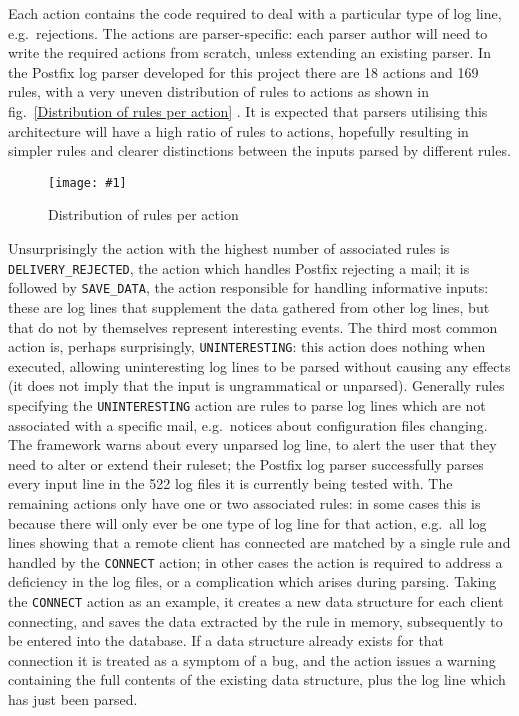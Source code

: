 \documentclass{svmult}
\newcommand{\showgraph}[3]{%
    \begin{figure}[btp]%
        \texttt{[image: \#1]}%
        \caption{#2}\label{#3}%
    \end{figure}%
}
\newcommand{\refwithlabel}[2]{%
    #1~\vref{#2}%
}
\newcommand{\graphref}[1]{%
    \refwithlabel{fig.}{#1}%
}
\newcommand{\numberOFrules}[0]{%
    169%
}
\newcommand{\numberOFlogFILESall}[0]{%
    522%
}
\newcommand{\numberOFactions}[0]{%
    18%
}
\begin{document}
Each action contains the code required to deal with a particular type of
log line, e.g.\ rejections.  The actions are parser-specific: each parser
author will need to write the required actions from scratch, unless
extending an existing parser.  In the Postfix log parser developed for this
project there are \numberOFactions{} actions and \numberOFrules{} rules,
with a very uneven distribution of rules to actions as shown in
\graphref{Distribution of rules per action}.  It is expected that parsers
utilising this architecture will have a high ratio of rules to actions,
hopefully resulting in simpler rules and clearer distinctions between the
inputs parsed by different rules.
\showgraph{build/graph-action-distribution}{Distribution of rules per
action}{Distribution of rules per action} Unsurprisingly the action with
the highest number of associated rules is \texttt{DELIVERY\_REJECTED}, the
action which handles Postfix rejecting a mail; it is followed by
\texttt{SAVE\_DATA}, the action responsible for handling informative
inputs: these are log lines that supplement the data gathered from other
log lines, but that do not by themselves represent interesting events.  The
third most common action is, perhaps surprisingly, \texttt{UNINTERESTING}:
this action does nothing when executed, allowing uninteresting log lines to
be parsed without causing any effects (it does not imply that the input is
ungrammatical or unparsed).  Generally rules specifying the
\texttt{UNINTERESTING} action are rules to parse log lines which are not
associated with a specific mail, e.g.\ notices about configuration files
changing.  The framework warns about every unparsed log line, to alert the
user that they need to alter or extend their ruleset; the Postfix log
parser successfully parses every input line in the \numberOFlogFILESall{}
log files it is currently being tested with.  The remaining actions only
have one or two associated rules: in some cases this is because there will
only ever be one type of log line for that action, e.g.\ all log lines
showing that a remote client has connected are matched by a single rule and
handled by the \texttt{CONNECT} action; in other cases the action is
required to address a deficiency in the log files, or a complication which
arises during parsing.  Taking the \texttt{CONNECT} action as an example,
it creates a new data structure for each client connecting, and saves the
data extracted by the rule in memory, subsequently to be entered into the
database.  If a data structure already exists for that connection it is
treated as a symptom of a bug, and the action issues a warning containing
the full contents of the existing data structure, plus the log line which
has just been parsed.
\end{document}
